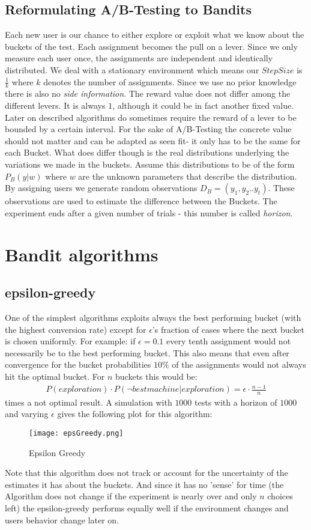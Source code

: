 \documentclass[main.tex]{subfiles}
\begin{document}
\subsection{Reformulating A/B-Testing to Bandits}
Each new user is our chance to either explore or exploit what we know about the buckets of the test. Each assignment becomes the pull on a lever. Since we only measure each user once, the assignments are independent and identically distributed. We deal with a stationary environment which means our $StepSize$ is $\frac{1}{k}$ where $k$ denotes the number of assignments. Since we use no prior knowledge there is also no \emph{side information}. The reward value does not differ among the different levers. It is always $1$, although it could be in fact another fixed value. Later on described algorithms do sometimes require the reward of a lever to be bounded by a certain interval. For the sake of A/B-Testing the concrete value should not matter and can be adapted as seen fit- it only has to be the same for each Bucket. What does differ though is the real distributions underlying the variations we made in the buckets. Assume this distributions to be of the form $P_B(y|w)$ where $w$ are the unknown parameters that describe the distribution. By assigning users we generate random observations $D_B=(y_1,y_2..y_t)$. These observations are used to estimate the difference between the Buckets. The experiment ends after a given number of trials - this number is called \emph{horizon}.

\section{Bandit algorithms}
\subsection{epsilon-greedy}
One of the simplest algorithms exploits always the best performing bucket (with the highest conversion rate) except for $\epsilon $'s fraction of cases where the next bucket is chosen uniformly. For example: if $\epsilon = 0.1$ every tenth assignment would not necessarily be to the best performing bucket. This also means that even after convergence for the bucket probabilities $10\%$ of the assignments would not always hit the optimal bucket. For $n$ buckets this would be:
\begin{align*}
P(exploration) \cdot P(\neg best machine | exploration) = \epsilon \cdot \frac{n-1}{n}
\end{align*}
times a not optimal result. A simulation with $1000$ tests with a horizon of $1000$ and varying $\epsilon$ gives the following plot for this algorithm:
\begin{figure}[ht]
\texttt{[image: epsGreedy.png]}
\centering
\caption{Epsilon Greedy}
\label{fig:EpsGreedy}
\end{figure}
Note that this algorithm does not track or account for the uncertainty of the estimates it has about the buckets. And since it has no 'sense' for time (the Algorithm does not change if the experiment is nearly over and only $n$ choices left) the epsilon-greedy performs equally well if the environment changes and users behavior change later on.
\end{document}
